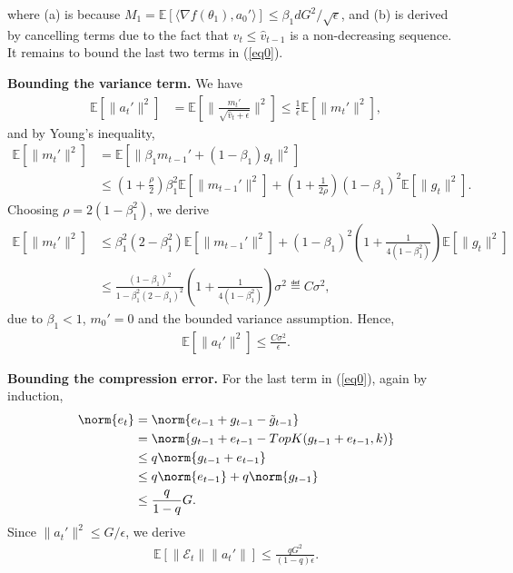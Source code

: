 \documentclass[11pt]{article}
\begin{document}
where (a) is because $M_1=\mathbb E[\langle\nabla f(\theta_1),a_0'\rangle]\leq \beta_1 d G^2/\sqrt{\epsilon}$, and (b) is derived by cancelling terms due to the fact that $\hat v_{t}\leq \hat v_{t-1}$ is a non-decreasing sequence. It remains to bound the last two terms in (\ref{eq0}).

\textbf{Bounding the variance term.} We have
\begin{align*}
    \mathbb E[\|a_t'\|^2]&=\mathbb E[\|\frac{m_t'}{\sqrt{\hat v_t+\epsilon}}\|^2]\leq \frac{1}{\epsilon}\mathbb E[\|m_t'\|^2],
\end{align*}
and by Young's inequality,
\begin{align*}
    \mathbb E[\|m_t'\|^2]&=\mathbb E[\|\beta_1m_{t-1}'+(1-\beta_1)g_t\|^2]\\
    &\leq (1+\frac{\rho}{2})\beta_1^2 \mathbb E[\|m_{t-1}'\|^2]+(1+\frac{1}{2\rho})(1-\beta_1)^2 \mathbb E[\|g_t\|^2].
\end{align*}
Choosing $\rho=2(1-\beta_1^2)$, we derive
\begin{align*}
    \mathbb E[\|m_t'\|^2]&\leq \beta_1^2(2-\beta_1^2)\mathbb E[\|m_{t-1}'\|^2]+(1-\beta_1)^2(1+\frac{1}{4(1-\beta_1^2)})\mathbb E[\|g_t\|^2]\\
    &\leq \frac{(1-\beta_1)^2}{1-\beta_1^2(2-\beta_1)^2}(1+\frac{1}{4(1-\beta_1^2)})\sigma^2\eqdef C\sigma^2,
\end{align*}
due to $\beta_1<1$, $m_0'=0$ and the bounded variance assumption. Hence,
\begin{align*}
    \mathbb E[\|a_t'\|^2]\leq \frac{C\sigma^2}{\epsilon}.
\end{align*}

\textbf{Bounding the compression error.} For the last term in (\ref{eq0}), again by induction,
\begin{equation}\label{eq:ineqe_t}
\begin{split}
\norm{e_t} & = \norm{e_{t-1} + g_{t-1} - \tilde g_{t-1}}\\
& =  \norm{ g_{t-1} + e_{t-1} - TopK(g_{t-1}+e_{t-1},k)}\\
& \leq q \norm{g_{t-1} + e_{t-1}}\\
& \leq q \norm{ e_{t-1}}+ q \norm{g_{t-1}}\\
& \leq \frac{q}{1-q}G.
\end{split}
\end{equation}
Since $\|a_t'\|^2\leq G/\epsilon$, we derive
\begin{align*}
    \mathbb E[\| \mathcal E_t\| \|a_t'\|]\leq \frac{qG^2}{(1-q)\epsilon}.
\end{align*}
\end{document}
